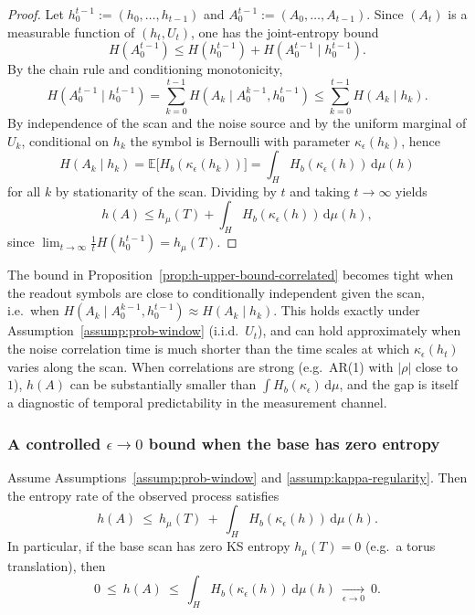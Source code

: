 \begin{proof}
Let $h_0^{t-1}:=(h_0,\dots,h_{t-1})$ and $A_0^{t-1}:=(A_0,\dots,A_{t-1})$.
Since $(A_t)$ is a measurable function of $(h_t,U_t)$, one has the joint-entropy bound
\[
H(A_0^{t-1})\le H(h_0^{t-1}) + H(A_0^{t-1}\mid h_0^{t-1}).
\]
By the chain rule and conditioning monotonicity,
\[
H(A_0^{t-1}\mid h_0^{t-1})
=\sum_{k=0}^{t-1} H(A_k\mid A_0^{k-1},h_0^{t-1})
\le \sum_{k=0}^{t-1} H(A_k\mid h_k).
\]
By independence of the scan and the noise source and by the uniform marginal of $U_k$, conditional on $h_k$ the symbol is Bernoulli with parameter $\kappa_\epsilon(h_k)$, hence
\[
H(A_k\mid h_k)=\mathbb{E}\bigl[H_b(\kappa_\epsilon(h_k))\bigr]=\int_H H_b(\kappa_\epsilon(h))\,\mathrm{d}\mu(h)
\]
for all $k$ by stationarity of the scan.
Dividing by $t$ and taking $t\to\infty$ yields
\[
h(A)\le h_\mu(T) + \int_H H_b(\kappa_\epsilon(h))\,\mathrm{d}\mu(h),
\]
since $\lim_{t\to\infty}\tfrac{1}{t}H(h_0^{t-1})=h_\mu(T)$.\cite{Walters1982,CoverThomas2006}
\end{proof}

\begin{remark}\label{rem:upper-bound-equality}
The bound in Proposition~\ref{prop:h-upper-bound-correlated} becomes tight when the readout symbols are close to conditionally independent given the scan, i.e.\ when
$H(A_k\mid A_0^{k-1},h_0^{t-1})\approx H(A_k\mid h_k)$.
This holds exactly under Assumption~\ref{assump:prob-window} (i.i.d.\ $U_t$), and can hold approximately when the noise correlation time is much shorter than the time scales at which $\kappa_\epsilon(h_t)$ varies along the scan. When correlations are strong (e.g.\ AR(1) with $|\rho|$ close to $1$), $h(A)$ can be substantially smaller than $\int H_b(\kappa_\epsilon)\,\mathrm{d}\mu$, and the gap is itself a diagnostic of temporal predictability in the measurement channel.
\end{remark}

\subsubsection{A controlled $\epsilon\to 0$ bound when the base has zero entropy}\label{sec:readout:epsilon-vanishing}

\begin{proposition}\label{prop:h-vanishes-eps}
Assume Assumptions~\ref{assump:prob-window} and \ref{assump:kappa-regularity}. Then the entropy rate of the observed process satisfies
\[
h(A)\ \le\ h_\mu(T)\ +\ \int_H H_b(\kappa_\epsilon(h))\,\mathrm{d}\mu(h).
\]
In particular, if the base scan has zero KS entropy $h_\mu(T)=0$ (e.g.\ a torus translation), then
\[
0\ \le\ h(A)\ \le\ \int_H H_b(\kappa_\epsilon(h))\,\mathrm{d}\mu(h)\ \xrightarrow[\epsilon\to 0]{}\ 0.
\]
\end{proposition}

